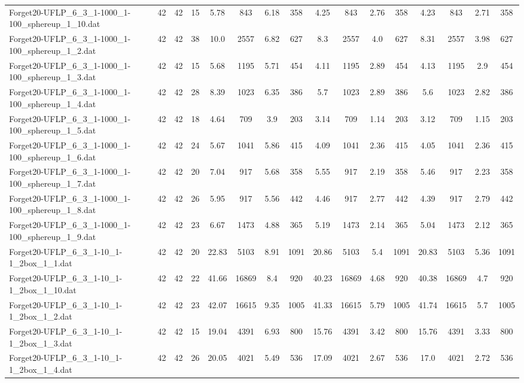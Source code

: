 \begin{sidewaystable}[!ht]
{\begin{tabular}{lccccccccccccccc}
Forget20-UFLP\_6\_3\_1-1000\_1-100\_sphereup\_1\_10.dat & 42 & 42 & 15 & 5.78 & 843 & 6.18 & 358 & 4.25 & 843 & 2.76 & 358 & 4.23 & 843 & 2.71 & 358 \\
Forget20-UFLP\_6\_3\_1-1000\_1-100\_sphereup\_1\_2.dat & 42 & 42 & 38 & 10.0 & 2557 & 6.82 & 627 & 8.3 & 2557 & 4.0 & 627 & 8.31 & 2557 & 3.98 & 627 \\
Forget20-UFLP\_6\_3\_1-1000\_1-100\_sphereup\_1\_3.dat & 42 & 42 & 15 & 5.68 & 1195 & 5.71 & 454 & 4.11 & 1195 & 2.89 & 454 & 4.13 & 1195 & 2.9 & 454 \\
Forget20-UFLP\_6\_3\_1-1000\_1-100\_sphereup\_1\_4.dat & 42 & 42 & 28 & 8.39 & 1023 & 6.35 & 386 & 5.7 & 1023 & 2.89 & 386 & 5.6 & 1023 & 2.82 & 386 \\
Forget20-UFLP\_6\_3\_1-1000\_1-100\_sphereup\_1\_5.dat & 42 & 42 & 18 & 4.64 & 709 & 3.9 & 203 & 3.14 & 709 & 1.14 & 203 & 3.12 & 709 & 1.15 & 203 \\
Forget20-UFLP\_6\_3\_1-1000\_1-100\_sphereup\_1\_6.dat & 42 & 42 & 24 & 5.67 & 1041 & 5.86 & 415 & 4.09 & 1041 & 2.36 & 415 & 4.05 & 1041 & 2.36 & 415 \\
Forget20-UFLP\_6\_3\_1-1000\_1-100\_sphereup\_1\_7.dat & 42 & 42 & 20 & 7.04 & 917 & 5.68 & 358 & 5.55 & 917 & 2.19 & 358 & 5.46 & 917 & 2.23 & 358 \\
Forget20-UFLP\_6\_3\_1-1000\_1-100\_sphereup\_1\_8.dat & 42 & 42 & 26 & 5.95 & 917 & 5.56 & 442 & 4.46 & 917 & 2.77 & 442 & 4.39 & 917 & 2.79 & 442 \\
Forget20-UFLP\_6\_3\_1-1000\_1-100\_sphereup\_1\_9.dat & 42 & 42 & 23 & 6.67 & 1473 & 4.88 & 365 & 5.19 & 1473 & 2.14 & 365 & 5.04 & 1473 & 2.12 & 365 \\
Forget20-UFLP\_6\_3\_1-10\_1-1\_2box\_1\_1.dat & 42 & 42 & 20 & 22.83 & 5103 & 8.91 & 1091 & 20.86 & 5103 & 5.4 & 1091 & 20.83 & 5103 & 5.36 & 1091 \\
Forget20-UFLP\_6\_3\_1-10\_1-1\_2box\_1\_10.dat & 42 & 42 & 22 & 41.66 & 16869 & 8.4 & 920 & 40.23 & 16869 & 4.68 & 920 & 40.38 & 16869 & 4.7 & 920 \\
Forget20-UFLP\_6\_3\_1-10\_1-1\_2box\_1\_2.dat & 42 & 42 & 23 & 42.07 & 16615 & 9.35 & 1005 & 41.33 & 16615 & 5.79 & 1005 & 41.74 & 16615 &  \textcolor{blue2}{5.7} & 1005 \\
Forget20-UFLP\_6\_3\_1-10\_1-1\_2box\_1\_3.dat & 42 & 42 & 15 & 19.04 & 4391 & 6.93 & 800 & 15.76 & 4391 & 3.42 & 800 & 15.76 & 4391 &  \textcolor{blue2}{3.33} & 800 \\
Forget20-UFLP\_6\_3\_1-10\_1-1\_2box\_1\_4.dat & 42 & 42 & 26 & 20.05 & 4021 & 5.49 & 536 & 17.09 & 4021 & 2.67 & 536 & 17.0 & 4021 & 2.72 & 536 \\

\end{tabular}}
\end{sidewaystable}

